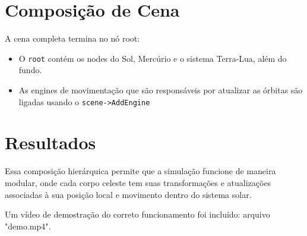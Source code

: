 \documentclass[11pt, a4paper]{article}
\begin{document}
\section {Composição de Cena}

A cena completa termina no nó root:

\begin{itemize}
\item O \texttt{root} contém os nodes do Sol, Mercúrio e o sistema Terra-Lua, além 
do fundo.
\item As engines de movimentação que são responsáveis por atualizar as órbitas 
são ligadas usando o \texttt{scene->AddEngine}
\end{itemize}

\section {Resultados}

Essa composição hierárquica permite que a simulação funcione de maneira modular, 
onde cada corpo celeste tem suas transformações e atualizações associadas à sua 
posição local e movimento dentro do sistema solar.

Um vídeo de demostração do correto funcionamento foi incluído: arquivo "demo.mp4".
\end{document}
